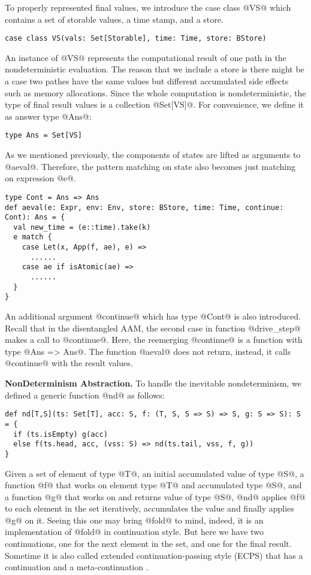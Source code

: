 \documentclass[acmsmall,review,anonymous]{acmart}\settopmatter{printfolios=true,printccs=false,printacmref=false}
\begin{document}
To properly represented final values, we introduce the case class @VS@ which
contains a set of storable values, a time stamp, and a store.
\begin{lstlisting}
case class VS(vals: Set[Storable], time: Time, store: BStore)
\end{lstlisting}
An instance of @VS@ represents the computational result of one path in
the nondeterministic evaluation.
The reason that we include a store is there might be a case two pathes have the
same values but different accumulated side effects such as memory allocations.
Since the whole computation is nondeterministic, the type of final result
values is a collection @Set[VS]@. For convenience, we define it as answer type @Ans@:
\begin{lstlisting}
type Ans = Set[VS]
\end{lstlisting}

As we mentioned previously, the components of states are lifted as arguments to
@aeval@. Therefore, the pattern matching on state also becomes just matching on
expression @e@.
\begin{lstlisting}
type Cont = Ans => Ans
def aeval(e: Expr, env: Env, store: BStore, time: Time, continue: Cont): Ans = {
  val new_time = (e::time).take(k)
  e match {
    case Let(x, App(f, ae), e) =>
      ......
    case ae if isAtomic(ae) =>
      ......
  }
}
\end{lstlisting}

An additional argument @continue@ which has type @Cont@ is also introduced.
Recall that in the disentangled AAM, the second case in function @drive_step@
makes a call to @continue@. Here, the reemerging @continue@ is a function
with type @Ans => Ans@. The function @aeval@ does not return, instead, it calls
@continue@ with the result values.

\textbf{NonDeterminism Abstraction.}
To handle the inevitable nondeterminism, we defined a generic function @nd@ as follows:
\begin{lstlisting}
def nd[T,S](ts: Set[T], acc: S, f: (T, S, S => S) => S, g: S => S): S = {
  if (ts.isEmpty) g(acc)
  else f(ts.head, acc, (vss: S) => nd(ts.tail, vss, f, g))
}
\end{lstlisting}

Given a set of element of type @T@, an initial accumulated value of type @S@, a function @f@
that works on element type @T@ and accumulated type @S@, and a function @g@ that
works on and returns value of type @S@, @nd@ applies @f@ to each element in the
set iteratively, accumulates the value and finally applies @g@ on it.
Seeing this one may bring @fold@ to mind, indeed, it is an implementation of
@fold@ in continuation style. But here we have two continuations, one for the
next element in the set, and one for the final result.
Sometime it is also called extended continuation-passing style (ECPS) that has a continuation and a
meta-continuation \cite{Danvy:1990:AC:91556.91622}.
\end{document}
